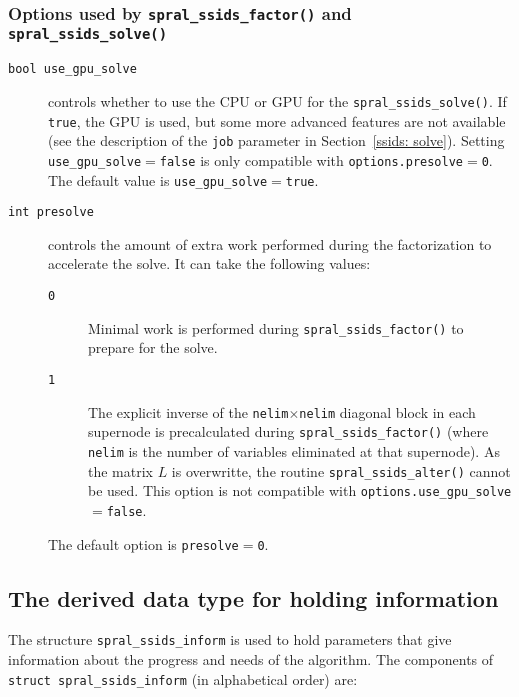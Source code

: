 \subsubsection*{Options used by {\tt spral\_ssids\_factor()} and {\tt spral\_ssids\_solve()}}

\begin{description}
\item[\texttt{bool use\_gpu\_solve}] controls
   whether to use the CPU or GPU for the \texttt{spral\_ssids\_solve()}. If
   \texttt{true}, the GPU is used, but some more advanced features are not
   available (see the description of the \texttt{job} parameter in
   Section~\ref{ssids: solve}).
   Setting \texttt{use\_gpu\_solve}$=${\tt false} is only compatible with
   \texttt{options.presolve}$=${\tt 0}.
   The default value is \texttt{use\_gpu\_solve}$=$\texttt{true}.
\item[\texttt{int presolve}] controls the
   amount of extra work performed during the factorization to accelerate the solve.
   It can take the following values:
   \begin{description}
      \item[\texttt{0}] Minimal work is performed during {\tt spral\_ssids\_factor()}
         to prepare for the solve.
      \item[\texttt{1}] The explicit inverse of the
         \texttt{nelim}$\times$\texttt{nelim} diagonal block in each supernode is
         precalculated during {\tt spral\_ssids\_factor()} (where \texttt{nelim} is
         the number of variables eliminated at that supernode). As the matrix
         $L$ is overwritte, the routine {\tt spral\_ssids\_alter()} cannot be
         used.
         This option is not compatible with {\tt options.use\_gpu\_solve}$=$\texttt{false}.
   \end{description}
   The default option is \texttt{presolve}$=$\texttt{0}.
\end{description}


\subsection{The derived data type for holding information}
\label{ssids: typeinform}
The structure {\tt spral\_ssids\_inform}
is used to hold parameters that give information about the progress and needs
of the algorithm. The components of {\tt struct spral\_ssids\_inform}
(in alphabetical order) are:

